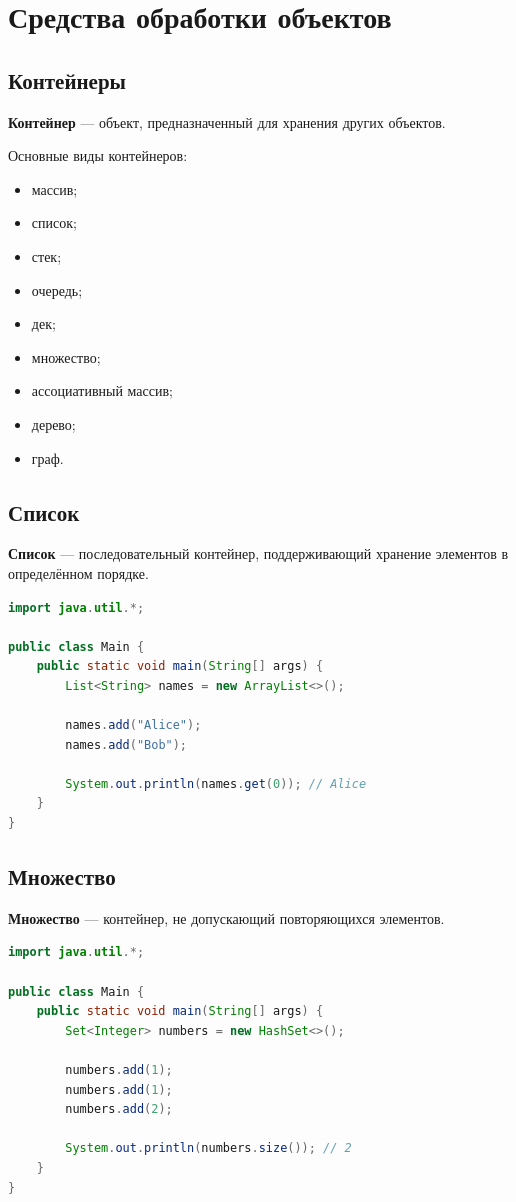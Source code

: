 \documentclass[12pt,a4paper]{article}
\begin{document}
\section{Средства обработки объектов}

\subsection{Контейнеры}

\textbf{Контейнер} --- объект, предназначенный для хранения других объектов.

Основные виды контейнеров:
\begin{itemize}
    \item массив;
    \item список;
    \item стек;
    \item очередь;
    \item дек;
    \item множество;
    \item ассоциативный массив;
    \item дерево;
    \item граф.
\end{itemize}

\subsection{Список}

\textbf{Список} --- последовательный контейнер, поддерживающий хранение элементов в определённом порядке.

\begin{lstlisting}[language=Java,caption={Список}]
import java.util.*;

public class Main {
    public static void main(String[] args) {
        List<String> names = new ArrayList<>();

        names.add("Alice");
        names.add("Bob");

        System.out.println(names.get(0)); // Alice
    }
}
\end{lstlisting}

\subsection{Множество}

\textbf{Множество} --- контейнер, не допускающий повторяющихся элементов.

\begin{lstlisting}[language=Java,caption={Множество}]
import java.util.*;

public class Main {
    public static void main(String[] args) {
        Set<Integer> numbers = new HashSet<>();

        numbers.add(1);
        numbers.add(1);
        numbers.add(2);

        System.out.println(numbers.size()); // 2
    }
}
\end{lstlisting}
\end{document}
